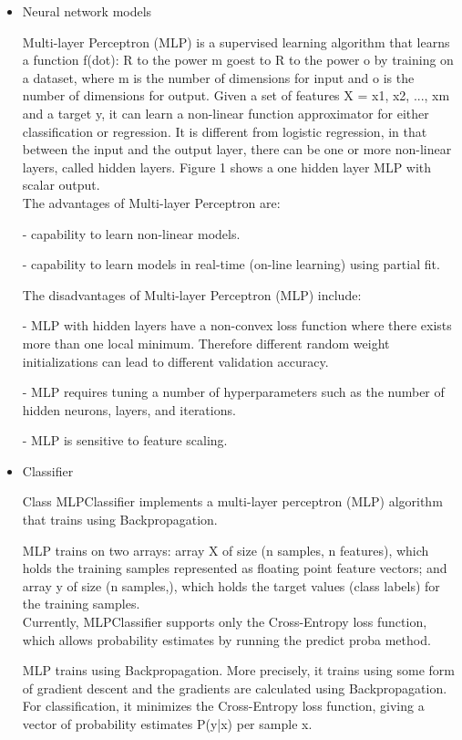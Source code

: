 \begin{itemize}
\item{Neural network models}

\tab Multi-layer Perceptron (MLP) is a supervised learning algorithm that learns a function f(dot): R to the power m goest to  R to the power o by training on a dataset, where m is the number of dimensions for input and o is the number of dimensions for output. Given a set of features X = {x1, x2, ..., xm} and a target y, it can learn a non-linear function approximator for either classification or regression. It is different from logistic regression, in that between the input and the output layer, there can be one or more non-linear layers, called hidden layers. Figure 1 shows a one hidden layer MLP with scalar output. \\ 

\tab The advantages of Multi-layer Perceptron are:

	- capability to learn non-linear models.

	- capability to learn models in real-time (on-line learning) using partial fit.

The disadvantages of Multi-layer Perceptron (MLP) include:

	- MLP with hidden layers have a non-convex loss function where there exists more than one local minimum. Therefore different random weight initializations can lead to different validation accuracy.

	- MLP requires tuning a number of hyperparameters such as the number of hidden neurons, layers, and iterations.

	- MLP is sensitive to feature scaling.  \\

\item{Classifier}

\tab Class MLPClassifier implements a multi-layer perceptron (MLP) algorithm that trains using Backpropagation.

MLP trains on two arrays: array X of size (n samples, n features), which holds the training samples represented as floating point feature vectors; and array y of size (n samples,), which holds the target values (class labels) for the training samples. \\

\tab  Currently, MLPClassifier supports only the Cross-Entropy loss function, which allows probability estimates by running the predict proba method.

MLP trains using Backpropagation. More precisely, it trains using some form of gradient descent and the gradients are calculated using Backpropagation. For classification, it minimizes the Cross-Entropy loss function, giving a vector of probability estimates P(y|x) per sample x. \\


\end{itemize}
